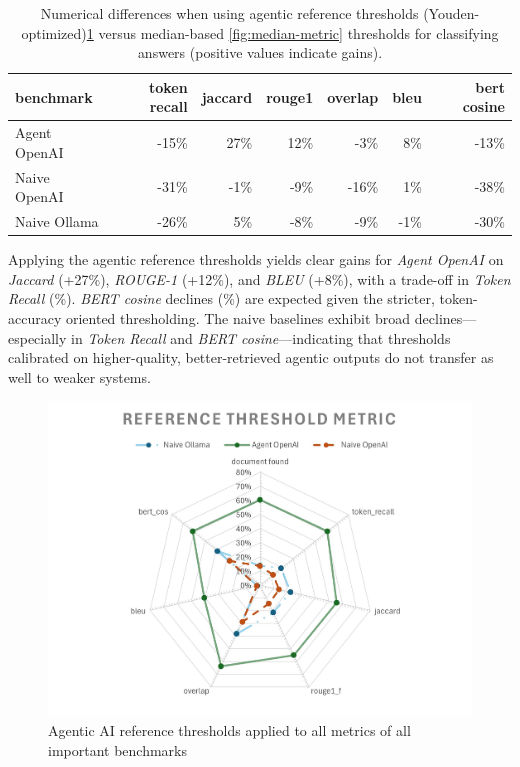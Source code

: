 \begin{table}[htbp]
    \centering
    \begin{tabular}{l r r r  r r r}
        \hline
        benchmark &  token recall & jaccard & rouge1 & overlap & bleu & bert cosine \\
        \hline
        Agent OpenAI &  -15\% & 27\% & 12\% & -3\% & 8\% & -13\% \\
        Naive OpenAI &  -31\% & -1\% & -9\% & -16\% & 1\% & -38\% \\
        Naive Ollama &  -26\% & 5\% & -8\% & -9\% & -1\% & -30\% \\
        \hline
    \end{tabular}
    \caption{Numerical differences when using agentic reference thresholds (Youden-optimized)\ref{fig:Youden-metric} versus median-based \ref{fig:median-metric} thresholds for classifying answers (positive values indicate gains).}
    \label{tab:gain-loss-reference-median}
\end{table}

Applying the agentic reference thresholds yields clear gains for \textit{Agent OpenAI} on \textit{Jaccard} (+27\%), \textit{ROUGE-1} (+12\%), and \textit{BLEU} (+8\%), with a trade-off in \textit{Token Recall} (\%). \textit{BERT cosine} declines (\%) are expected given the stricter, token-accuracy oriented thresholding. The naive baselines exhibit broad declines—especially in \textit{Token Recall} and \textit{BERT cosine}—indicating that thresholds calibrated on higher-quality, better-retrieved agentic outputs do not transfer as well to weaker systems.
\begin{figure}
    \centering
    \includegraphics[width=0.75\linewidth]{Figures/Reference Threshold Metric.jpg}
    \caption{Agentic AI reference thresholds applied to all metrics of all important benchmarks}
    \label{fig:Youden-metric}
\end{figure}

